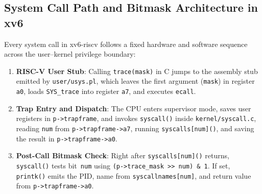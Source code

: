 \documentclass[12pt,a4paper]{article}
\begin{document}
\subsection{System Call Path and Bitmask Architecture in xv6}
Every system call in xv6-riscv follows a fixed hardware and software sequence across the user--kernel privilege boundary:
\begin{enumerate}
    \item \textbf{RISC-V User Stub}: Calling \texttt{trace(mask)} in C jumps to the assembly stub emitted by \texttt{user/usys.pl}, which leaves the first argument (\texttt{mask}) in register \texttt{a0}, loads \texttt{SYS\_trace} into register \texttt{a7}, and executes \texttt{ecall}.
    \item \textbf{Trap Entry and Dispatch}: The CPU enters supervisor mode, saves user registers in \texttt{p->trapframe}, and invokes \texttt{syscall()} inside \texttt{kernel/\allowbreak syscall.c}, reading \texttt{num} from \texttt{p->trapframe->a7}, running \texttt{syscalls[num]()}, and saving the result in \texttt{p->trapframe->a0}.
    \item \textbf{Post-Call Bitmask Check}: Right after \texttt{syscalls[num]()} returns, \texttt{syscall()} tests bit~\texttt{num} using \texttt{(p->trace\_mask >{}> num) \& 1}. If set, \texttt{printk()} emits the PID, name from \texttt{syscallnames[num]}, and return value from \texttt{p->trapframe->a0}.
\end{enumerate}
\end{document}
